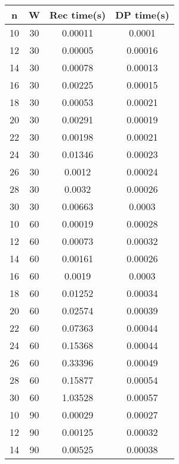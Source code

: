 \documentclass{article}
\begin{document}
    \begin{center}
        \begin{tabular}{||c c c c||} 
        \hline
        n & W & Rec time(s) & DP time(s) \\ [0.5ex] 
        \hline\hline
        10 & 30 & 0.00011 & 0.0001 \\
        \hline
        12 & 30 & 0.00005 & 0.00016 \\
        \hline
        14 & 30 & 0.00078 & 0.00013 \\
        \hline
        16 & 30 & 0.00225 & 0.00015 \\
        \hline
        18 & 30 & 0.00053 & 0.00021 \\
        \hline
        20 & 30 & 0.00291 & 0.00019 \\
        \hline
        22 & 30 & 0.00198 & 0.00021 \\
        \hline
        24 & 30 & 0.01346 & 0.00023 \\
        \hline
        26 & 30 & 0.0012 & 0.00024 \\
        \hline
        28 & 30 & 0.0032 & 0.00026 \\
        \hline
        30 & 30 & 0.00663 & 0.0003 \\
        \hline\hline
        10 & 60 & 0.00019 & 0.00028 \\
        \hline
        12 & 60 & 0.00073 & 0.00032 \\
        \hline
        14 & 60 & 0.00161 & 0.00026 \\
        \hline
        16 & 60 & 0.0019 & 0.0003 \\
        \hline
        18 & 60 & 0.01252 & 0.00034 \\
        \hline
        20 & 60 & 0.02574 & 0.00039 \\
        \hline
        22 & 60 & 0.07363 & 0.00044 \\
        \hline
        24 & 60 & 0.15368 & 0.00044 \\
        \hline
        26 & 60 & 0.33396 & 0.00049 \\
        \hline
        28 & 60 & 0.15877 & 0.00054 \\
        \hline
        30 & 60 & 1.03528 & 0.00057 \\
        \hline\hline
        10 & 90 & 0.00029 & 0.00027 \\
        \hline
        12 & 90 & 0.00125 & 0.00032 \\
        \hline
        14 & 90 & 0.00525 & 0.00038 \\

\end{tabular}
\end{center}
\end{document}

